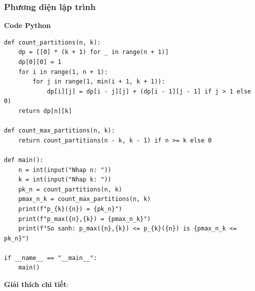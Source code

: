 \documentclass[a4paper,12pt]{article}
\begin{document}
\subsubsection{Phương diện lập trình}
\textbf{Code Python}
\begin{lstlisting}
def count_partitions(n, k):
    dp = [[0] * (k + 1) for _ in range(n + 1)]
    dp[0][0] = 1
    for i in range(1, n + 1):
        for j in range(1, min(i + 1, k + 1)):
            dp[i][j] = dp[i - j][j] + (dp[i - 1][j - 1] if j > 1 else 0)
    return dp[n][k]

def count_max_partitions(n, k):
    return count_partitions(n - k, k - 1) if n >= k else 0

def main():
    n = int(input("Nhap n: "))
    k = int(input("Nhap k: "))
    pk_n = count_partitions(n, k)
    pmax_n_k = count_max_partitions(n, k)
    print(f"p_{k}({n}) = {pk_n}")
    print(f"p_max({n},{k}) = {pmax_n_k}")
    print(f"So sanh: p_max({n},{k}) <= p_{k}({n}) is {pmax_n_k <= pk_n}")

if __name__ == "__main__":
    main()
\end{lstlisting}
\textbf{Giải thích chi tiết}:
\end{document}
